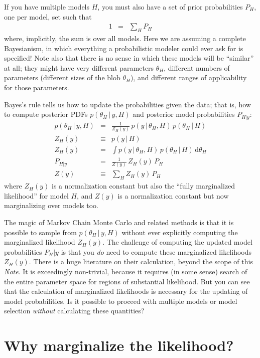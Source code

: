 \documentclass[12pt]{article}
\newcommand{\documentname}{\textsl{Note}}
\newcommand{\dd}{\mathrm{d}}
\newcommand{\given}{\,|\,}
\begin{document}
If you have multiple models $H$,
  you must also have a set of prior probabilities $P_H$, one per model,
  set such that
\begin{eqnarray}
1 &=& \sum_H P_H
\end{eqnarray}
where, implicitly,
the sum is over all models.
Here we are assuming a complete Bayesianism,
  in which everything a probabilistic modeler could ever ask for is specified!
Note also that there is no sense in which these models will be ``similar'' at all;
  they might have very different parameters $\theta_H$,
  different numbers of parameters (different sizes of the blob $\theta_H$),
  and different ranges of applicability for those parameters.

Bayes's rule tells us how to update the probabilities given the data;
  that is, how to compute posterior PDFs $p(\theta_H\given y,H)$
  and posterior model probabilities $P_{H|y}$:
\begin{eqnarray}
p(\theta_H\given y,H) &=& \frac{1}{Z_H(y)}\,p(y\given\theta_H,H)\,p(\theta_H\given H)
\\
Z_H(y) &\equiv& p(y\given H)
\\
Z_H(y) &=& \int p(y\given\theta_H,H)\,p(\theta_H\given H)\,\dd\theta_H
\\
P_{H|y} &=& \frac{1}{Z(y)}\,Z_H(y)\,P_H
\\
Z(y) &\equiv& \sum_H Z_H(y)\,P_H
\end{eqnarray}
where
$Z_H(y)$ is a normalization constant
  but also the ``fully marginalized likelihood'' for model $H$, and
$Z(y)$ is a normalization constant but
  now marginalizing over models too.

The magic of Markov Chain Monte Carlo and related methods is that
  it is possible to sample from $p(\theta_H\given y,H)$ without ever explicitly computing
  the marginalized likelihood $Z_H(y)$.
The challenge of computing the updated model probabilities $P_H|y$
  is that you \emph{do} need to compute these marginalized likelihoods $Z_H(y)$.
There is a huge literature on their calculation, beyond the scope of this \documentname.
It is exceedingly non-trivial,
  because it requires (in some sense) search of the entire parameter space
  for regions of substantial likelihood.
But you can see that the calculation of marginalized likelihoods is necessary
  for the updating of model probabilities.
Is it possible to proceed with multiple models or model selection
  \emph{without} calculating these quantities?

\section{Why marginalize the likelihood?}
\end{document}
